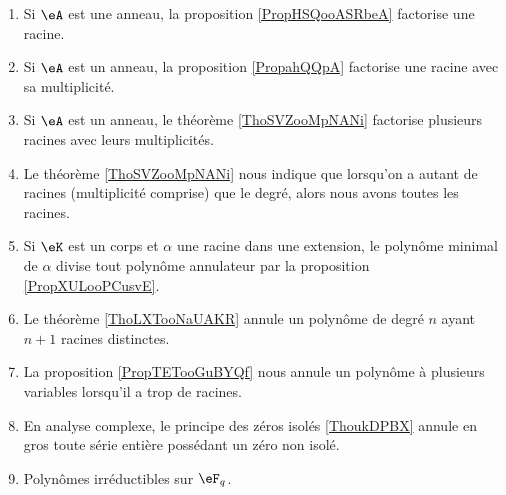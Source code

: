 \begin{description}
    \begin{enumerate}
        \item
            Si \( \eA\) est une anneau, la proposition \ref{PropHSQooASRbeA} factorise une racine.
        \item
            Si \( \eA\) est un anneau, la proposition \ref{PropahQQpA} factorise une racine avec sa multiplicité.
        \item
            Si \( \eA\) est un anneau, le théorème \ref{ThoSVZooMpNANi} factorise plusieurs racines avec leurs multiplicités.
        \item
            Le théorème \ref{ThoSVZooMpNANi} nous indique que lorsqu'on a autant de racines (multiplicité comprise) que le degré, alors nous avons toutes les racines.
        \item
            Si \( \eK\) est un corps et \( \alpha\) une racine dans une extension, le polynôme minimal de \( \alpha\) divise tout polynôme annulateur par la proposition \ref{PropXULooPCusvE}.
        \item
            Le théorème \ref{ThoLXTooNaUAKR} annule un polynôme de degré \( n\) ayant \( n+1\) racines distinctes.
        \item
            La proposition \ref{PropTETooGuBYQf} nous annule un polynôme à plusieurs variables lorsqu'il a trop de racines.
        \item
            En analyse complexe, le principe des zéros isolés \ref{ThoukDPBX} annule en gros toute série entière possédant un zéro non isolé.
        \item 
            Polynômes irréductibles sur \( \eF_q\).
        \end{enumerate}

\end{description}



